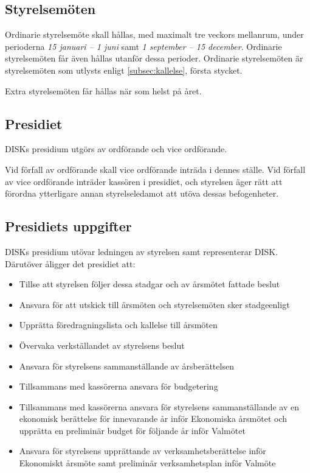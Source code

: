 	\subsection{Styrelsemöten}
	\label{subsec:styrelsemoten}
		Ordinarie styrelsemöte skall hållas, med maximalt tre veckors mellanrum, under perioderna \emph{15 januari – 1 juni} samt \emph{1 september – 15 december}. Ordinarie styrelsemöten får även hållas utanför dessa perioder. Ordinarie styrelsemöten är styrelsemöten som utlysts enligt \ref{subsec:kallelse}, första stycket.\par
		Extra styrelsemöten får hållas när som helst på året.

	\subsection{Presidiet}
	\label{subsec:presidiet}
		DISKs presidium utgörs av ordförande och vice ordförande.\par
		Vid förfall av ordförande skall vice ordförande inträda i dennes ställe. Vid förfall av vice ordförande inträder kassören i presidiet, och styrelsen äger rätt att förordna ytterligare annan styrelseledamot att utöva dessas befogenheter.

	\subsection{Presidiets uppgifter}
	\label{subsec:presidietsuppgifter}
		DISKs presidium utövar ledningen av styrelsen samt representerar DISK. Därutöver åligger det presidiet att:
		\begin{itemize}
		\setlength{\itemsep}{0.0cm}
		\setlength{\parskip}{0.0cm}
			\item Tillse att styrelsen följer dessa stadgar och av årsmötet fattade beslut
			\item Ansvara för att utskick till årsmöten och styrelsemöten sker stadgeenligt
			\item Upprätta föredragningslista och kallelse till årsmöten
			\item Övervaka verkställandet av styrelsens beslut
			\item Ansvara för styrelsens sammanställande av årsberättelsen
			\item Tillsammans med kassörerna ansvara för budgetering
			\item Tillsammans med kassörerna ansvara för styrelsens sammanställande av en ekonomisk berättelse för innevarande år inför Ekonomiska årsmötet och upprätta en preliminär budget för följande år inför Valmötet
			\item Ansvara för styrelsens upprättande av verksamhetsberättelse inför Ekonomiskt årsmöte samt preliminär verksamhetsplan inför Valmöte
		\end{itemize}

